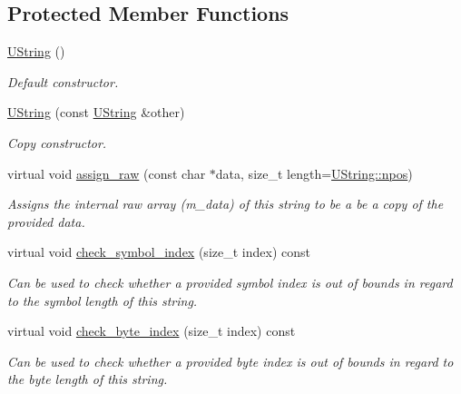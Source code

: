 \subsection*{Protected Member Functions}
\begin{DoxyCompactItemize}
\item 
\hypertarget{classchaos_1_1uni_1_1_u_string_a7300070e0775f5cd9c747ca7c2025c71}{}\hyperlink{classchaos_1_1uni_1_1_u_string_a7300070e0775f5cd9c747ca7c2025c71}{U\+String} ()\label{classchaos_1_1uni_1_1_u_string_a7300070e0775f5cd9c747ca7c2025c71}

\begin{DoxyCompactList}\small\item\em Default constructor. \end{DoxyCompactList}\item 
\hyperlink{classchaos_1_1uni_1_1_u_string_a4ff2f82ba14d36b18366076969ecd164}{U\+String} (const \hyperlink{classchaos_1_1uni_1_1_u_string}{U\+String} \&other)
\begin{DoxyCompactList}\small\item\em Copy constructor. \end{DoxyCompactList}\item 
virtual void \hyperlink{classchaos_1_1uni_1_1_u_string_a9eae392a87be35a21ae1d905b446c7e4}{assign\+\_\+raw} (const char $\ast$data, size\+\_\+t length=\hyperlink{classchaos_1_1uni_1_1_u_string_a5002d169446e9ab2baf8a028ec6ee9b0}{U\+String\+::npos})
\begin{DoxyCompactList}\small\item\em Assigns the internal raw array ({\ttfamily m\+\_\+data}) of this string to be a be a copy of the provided data. \end{DoxyCompactList}\item 
virtual void \hyperlink{classchaos_1_1uni_1_1_u_string_ac55843515602400976af0706f11514d7}{check\+\_\+symbol\+\_\+index} (size\+\_\+t index) const 
\begin{DoxyCompactList}\small\item\em Can be used to check whether a provided symbol index is out of bounds in regard to the symbol length of this string. \end{DoxyCompactList}\item 
virtual void \hyperlink{classchaos_1_1uni_1_1_u_string_ad8557fc6d7739054e089f607ffaae8c4}{check\+\_\+byte\+\_\+index} (size\+\_\+t index) const 
\begin{DoxyCompactList}\small\item\em Can be used to check whether a provided byte index is out of bounds in regard to the byte length of this string. \end{DoxyCompactList}\end{DoxyCompactItemize}
